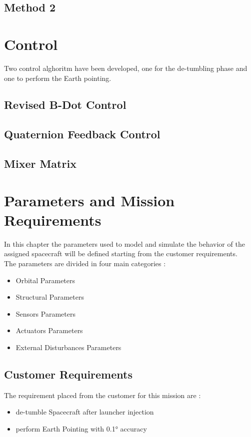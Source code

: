 \documentclass[11pt,a4paper]{report}
\begin{document}
\section{Method 2}

\chapter{Control}
Two control alghoritm have been developed, one for the de-tumbling phase and one to perform the Earth pointing.

\section{Revised B-Dot Control}
\section{Quaternion Feedback Control}
\section{Mixer Matrix}

\chapter{Parameters and Mission Requirements}
In this chapter the parameters used to model and simulate the behavior of the assigned spacecraft will be defined starting from the customer requirements.\\
The parameters are divided in four main categories : 

\begin{itemize}
 \item Orbital Parameters
 \item Structural Parameters
 \item Sensors Parameters
 \item Actuators Parameters
 \item External Disturbances Parameters
\end{itemize}

\section{Customer Requirements}
The requirement placed from the customer for this mission are :

\begin{itemize}
 \item de-tumble Spacecraft after launcher injection
 \item perform Earth Pointing with \ang{0.1} accuracy
\end{itemize}
\end{document}
